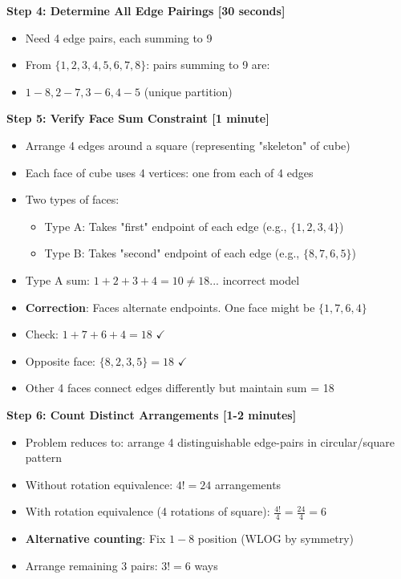 \documentclass[]{article}
\begin{document}
\begin{solutionbox}
\textbf{Step 4: Determine All Edge Pairings [30 seconds]}
\begin{itemize}[nosep]
    \item Need 4 edge pairs, each summing to 9
    \item From $\{1,2,3,4,5,6,7,8\}$: pairs summing to 9 are:
    \item $1-8, 2-7, 3-6, 4-5$ (unique partition)
\end{itemize}

\textbf{Step 5: Verify Face Sum Constraint [1 minute]}
\begin{itemize}[nosep]
    \item Arrange 4 edges around a square (representing "skeleton" of cube)
    \item Each face of cube uses 4 vertices: one from each of 4 edges
    \item Two types of faces:
    \begin{itemize}
        \item Type A: Takes "first" endpoint of each edge (e.g., $\{1,2,3,4\}$)
        \item Type B: Takes "second" endpoint of each edge (e.g., $\{8,7,6,5\}$)
    \end{itemize}
    \item Type A sum: $1+2+3+4 = 10 \neq 18$... incorrect model
    \item \textbf{Correction}: Faces alternate endpoints. One face might be $\{1,7,6,4\}$
    \item Check: $1+7+6+4 = 18$ $\checkmark$
    \item Opposite face: $\{8,2,3,5\} = 18$ $\checkmark$
    \item Other 4 faces connect edges differently but maintain sum = 18
\end{itemize}

\textbf{Step 6: Count Distinct Arrangements [1-2 minutes]}
\begin{itemize}[nosep]
    \item Problem reduces to: arrange 4 distinguishable edge-pairs in circular/square pattern
    \item Without rotation equivalence: $4! = 24$ arrangements
    \item With rotation equivalence (4 rotations of square): $\frac{4!}{4} = \frac{24}{4} = 6$
    \item \textbf{Alternative counting}: Fix $1-8$ position (WLOG by symmetry)
    \item Arrange remaining 3 pairs: $3! = 6$ ways
\end{itemize}


\end{solutionbox}
\end{document}
